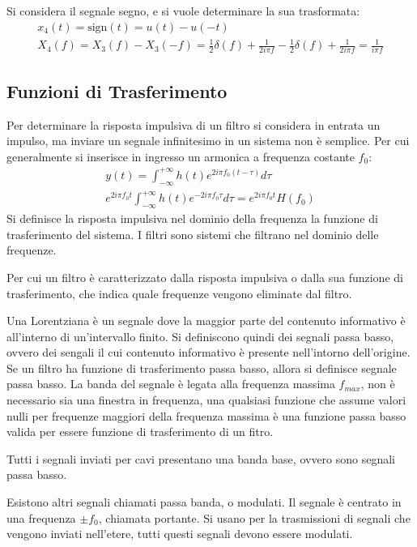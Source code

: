 \documentclass{article}
\numberwithin{equation}{subsection}
\begin{document}
Si considera il segnale segno, e si vuole determinare la sua trasformata:
\begin{gather*}
    x_4(t)=\mbox{sign}(t)=u(t)-u(-t)\\
    X_4(f)=X_3(f)-X_3(-f)=\displaystyle\frac{1}{2}\delta(f)+\frac{1}{2i\pi f}-\frac{1}{2}\delta(f)+\frac{1}{2i\pi f}=\frac{1}{i\pi f}
\end{gather*}

\subsection{Funzioni di Trasferimento}

Per determinare la risposta impulsiva di un filtro si considera in entrata un impulso, ma inviare un segnale infinitesimo in un sistema non è semplice. Per cui generalmente 
si inserisce in ingresso un armonica a frequenza costante $f_0$:
\begin{gather*}
    y(t)=\displaystyle\int_{-\infty}^{+\infty}h(t)e^{2i\pi f_0(t-\tau)}d\tau\\
    e^{2i\pi f_0t}\displaystyle\int_{-\infty}^{+\infty}h(t)e^{-2i\pi f_0\tau}d\tau=e^{2i\pi f_0t}H(f_0)
\end{gather*}
Si definisce la risposta impulsiva nel dominio della frequenza la funzione di trasferimento del sistema. I filtri sono sistemi che filtrano nel dominio delle frequenze. 

Per cui un filtro è caratterizzato dalla risposta impulsiva o dalla sua funzione di trasferimento, che indica quale frequenze vengono eliminate dal filtro. 




Una Lorentziana è un segnale dove la maggior parte del contenuto informativo è all'interno di un'intervallo finito. Si definiscono quindi dei segnali passa basso, 
ovvero dei sengali il cui contenuto informativo è presente nell'intorno dell'origine. Se un filtro ha funzione di trasferimento passa basso, allora si definisce segnale 
passa basso. La banda del segnale è legata alla frequenza massima $f_{max}$, non è necessario sia una finestra in frequenza, una qualsiasi funzione che assume valori nulli 
per frequenze maggiori della frequenza massima è una funzione passa basso valida per essere funzione di trasferimento di un fitro. 

Tutti i segnali inviati per cavi presentano una banda base, ovvero sono segnali passa basso. 


Esistono altri segnali chiamati passa banda, o modulati. Il segnale è centrato in una frequenza $\pm f_0$, chiamata portante. Si usano per la trasmissioni di segnali 
che vengono inviati nell'etere, tutti questi segnali devono essere modulati. 
\end{document}
